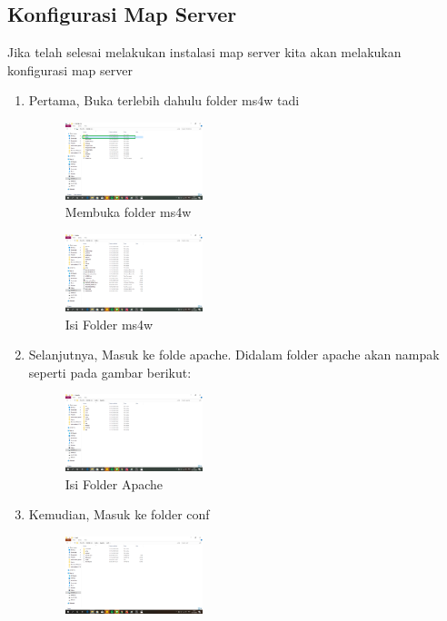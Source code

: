 \subsection{Konfigurasi Map Server}
Jika telah selesai melakukan instalasi map server kita akan melakukan konfigurasi map server
\begin{enumerate}
  \item Pertama, Buka terlebih dahulu folder ms4w tadi
  \hfill\break
    \begin{figure}[H]
		\includegraphics[width=4cm]{figures/tugas4/1174053/9.png}
		\centering
		\caption{Membuka folder ms4w}
    \end{figure}
    \hfill\break
    \begin{figure}[H]
		\includegraphics[width=4cm]{figures/tugas4/1174053/10.png}
		\centering
		\caption{Isi Folder ms4w}
    \end{figure}
  \item Selanjutnya, Masuk ke folde apache. Didalam folder apache akan nampak seperti pada gambar berikut:
  \hfill\break
    \begin{figure}[H]
		\includegraphics[width=4cm]{figures/tugas4/1174053/11.png}
		\centering
		\caption{Isi Folder Apache}
    \end{figure}
  \item Kemudian, Masuk ke folder conf
  \hfill\break
    \begin{figure}[H]
		\includegraphics[width=4cm]{figures/tugas4/1174053/12.png}

\end{figure}
\end{enumerate}
